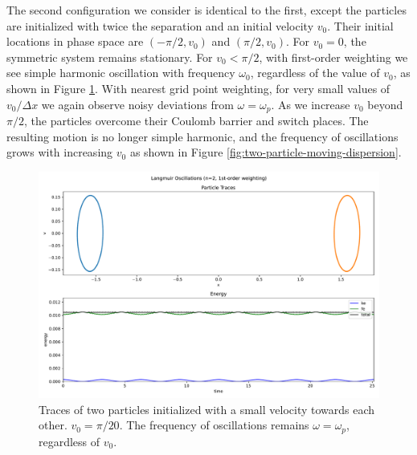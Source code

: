 \documentclass[%
 reprint,
 amsmath,amssymb,
 aps,
]{revtex4-2}
\begin{document}
The second configuration we consider is identical to the first, except the particles are initialized with twice the separation and an initial velocity $v_0$. Their initial locations in phase space are $(- \pi / 2, v_0)$ and $(\pi / 2, v_0)$. For $v_0 = 0$, the symmetric system remains stationary. For $v_0 < \pi/2$, with first-order weighting we see simple harmonic oscillation with frequency $\omega_0$, regardless of the value of $v_0$, as shown in Figure \ref{fig:two-particle-moving-trace}. With nearest grid point weighting, for very small values of $v_0/\Delta x$ we again observe noisy deviations from $\omega = \omega_p$. As we increase $v_0$ beyond $\pi/2$, the particles overcome their Coulomb barrier and switch places. The resulting motion is no longer simple harmonic, and the frequency of oscillations grows with increasing $v_0$ as shown in Figure \ref{fig:two-particle-moving-dispersion}.

\begin{figure}
\includegraphics[width=0.9\linewidth]{proj2/langmuir_moving_trace.pdf}
\caption{\label{fig:two-particle-moving-trace}Traces of two particles initialized with a small velocity towards each other. $v_0 = \pi / 20$. The frequency of oscillations remains $\omega = \omega_p$, regardless of $v_0$.}
\end{figure}
\end{document}
